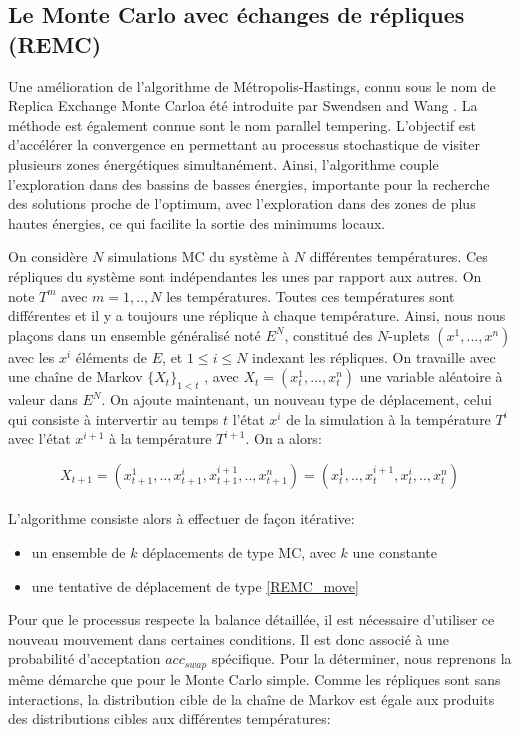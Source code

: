 \subsection{Le Monte Carlo avec échanges de répliques (REMC)}
\label{REMC}

Une amélioration de l'algorithme de Métropolis-Hastings, connu sous le nom de \og Replica Exchange Monte Carlo\fg a été introduite par Swendsen and Wang \cite{Swendsen86}. La méthode est également connue sont le nom \og parallel tempering\fg. L'objectif est d'accélérer la convergence en permettant au processus stochastique de visiter plusieurs zones énergétiques simultanément. Ainsi, l'algorithme couple l'exploration dans des bassins de basses énergies, importante pour la recherche des solutions proche de l'optimum, avec l'exploration dans des zones de plus hautes énergies, ce qui facilite la sortie des minimums locaux.

On considère $N$ simulations MC du système à $N$ différentes températures. Ces répliques du système sont indépendantes les unes par rapport aux autres. On note $T^m$ avec $m=1,..,N$ les températures. Toutes ces températures sont différentes et il y a toujours une réplique à chaque température. Ainsi, nous nous plaçons dans un ensemble généralisé noté $E^N$, constitué des $N$-uplets $(x^1,...,x^n)$ avec les $x^i$ éléments de $E$, et $1 \leqslant i \leqslant N$  indexant les répliques. On travaille avec une chaîne de Markov $\{X_t\}_{1<t}$ , avec $X_t=(x^1_t,...,x^n_t)$ une variable aléatoire à valeur dans $E^N$. On ajoute maintenant, un nouveau type de déplacement, celui qui consiste à intervertir au temps $t$ l'état $x^i$ de la simulation à la température $T^i$ avec l'état $x^{i+1}$ à la température $T^{i+1}$. On a alors:

\begin{equation}
  \label{REMC_move}
X_{t+1}=(x_{t+1}^1,..,x_{t+1}^i,x_{t+1}^{i+1},..,x_{t+1}^n) = (x_t^1,..,x_t^{i+1},x_t^i,..,x_t^n)
\end{equation}\\
L'algorithme consiste alors à effectuer de façon itérative:
\begin{itemize}
\item un ensemble de $k$ déplacements de type MC, avec $k$ une constante  
\item une tentative de déplacement de type \ref{REMC_move} 
\end{itemize}

Pour que le processus respecte la balance détaillée, il est nécessaire d'utiliser ce nouveau mouvement dans certaines conditions. Il est donc associé à une probabilité d'acceptation $acc_{swap}$ spécifique. Pour la déterminer, nous reprenons la même démarche que pour le Monte Carlo simple. Comme les répliques sont sans interactions, la distribution cible de la chaîne de Markov est égale aux produits des distributions cibles aux différentes températures:

